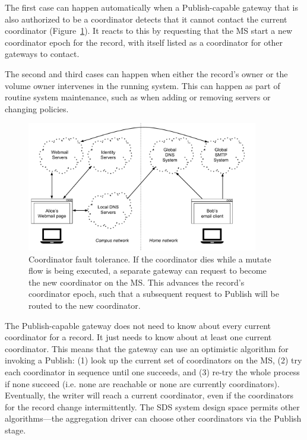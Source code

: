 The first case can happen automatically when a Publish-capable gateway that is
also authorized to be a coordinator detects that it cannot contact the
current coordinator (Figure~\ref{fig:chap2-coordinator-change}).  It reacts to this by requesting that the MS start
a new coordinator epoch for the record, with itself listed as a coordinator for other gateways to contact.

The second and third cases can happen when either the record's owner or the
volume owner intervenes in the running system.  This can happen as part of routine system
maintenance, such as when adding or removing servers or changing
policies.

\begin{figure}[h!]
   \centering
   \includegraphics[width=0.9\textwidth,page=11]{figures/dissertation-figures}
   \caption{Coordinator fault tolerance.  If the coordinator dies while a mutate
   flow is being executed, a separate gateway can request to become the new
   coordinator on the MS.  This advances the record's coordinator epoch, such
   that a subsequent request to Publish will be routed to the new coordinator.}
   \label{fig:chap2-coordinator-change}
\end{figure}

The Publish-capable gateway does not need to know
about every current coordinator for a record.  It just needs to know about
at least one current coordinator.  This means that the gateway can use an
optimistic algorithm for invoking a Publish: 
(1) look up the current set of coordinators on the MS, (2) try each coordinator in
sequence until one succeeds, and (3) re-try the whole process if none
succeed (i.e. none are reachable or none are currently coordinators).
Eventually, the writer will reach a current coordinator, even if the
coordinators for the record change intermittently.  The SDS system design space
permits other algorithms---the aggregation driver can choose other coordinators
via the Publish stage.

